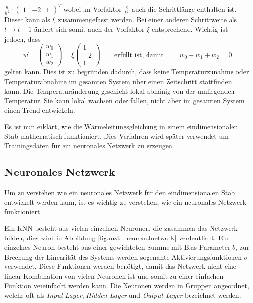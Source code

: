 $\frac{\kappa}{h^2} \cdot  \begin{pmatrix} 1 & -2 & 1 \end{pmatrix}^{T}$
wobei im Vorfaktor $\frac{\kappa}{h^2}$ auch die Schrittlänge
enthalten ist. Dieser kann als $\xi$ zusammengefasst werden. Bei
einer anderen Schrittweite als $t \rightarrow t+1$ ändert sich somit
auch der Vorfaktor $\xi$ entsprechend. Wichtig ist jedoch, dass
\begin{equation}
	\vec{w} = \begin{pmatrix} w_{0} \\ w_{1} \\ w_{2} \end{pmatrix} = \xi \begin{pmatrix} 1 \\ -2 \\ 1 \end{pmatrix}
	\qquad\text{erfüllt ist, damit }\qquad
	w_{0} + w_{1} + w_{2} = 0
\end{equation}
gelten kann. Dies ist zu begründen dadurch, dass keine Temperaturzunahme
oder Temperaturabnahme im gesamten System über einen Zeitschritt
stattfinden kann. Die Temperaturänderung geschieht lokal abhänig
von der umliegenden Temperatur. Sie kann lokal wachsen oder fallen,
nicht aber im gesamten System einen Trend entwickeln.

Es ist nun erklärt, wie die Wärmeleitungsgleichung in einem
eindimensionalen Stab mathematisch funktioniert. Dies Verfahren
wird später verwendet um Trainingsdaten für ein neuronales Netzwerk
zu erzeugen.

\subsection{Neuronales Netzwerk}
Um zu verstehen wie ein neuronales Netzwerk für den eindimensionalen
Stab entwickelt werden kann, ist es wichtig zu verstehen, wie ein
neuronales Netzwerk funktioniert.

Ein KNN besteht aus vielen einzelnen Neuronen, die zusammen das
Netzwerk bilden, dies wird in Abbildung \ref{fig:mst_neuronalnetwork}
verdeutlicht. Ein einzelnes Neuron besteht aus einer gewichteten
Summe mit Bias Parameter $b$, zur Brechung der Linearität des
Systems werden sogenante Aktivierungsfunktionen $\sigma$ verwendet.
Diese Funktionen werden benötigt, damit das Netzwerk nicht eine
linear Kombination von vielen Neuronen ist und somit zu einer
einfachen Funktion vereinfacht werden kann. Die Neuronen werden in
Gruppen angeordnet, welche oft als \textit{Input Layer}, \textit{Hidden
Layer} und \textit{Output Layer} bezeichnet werden.

